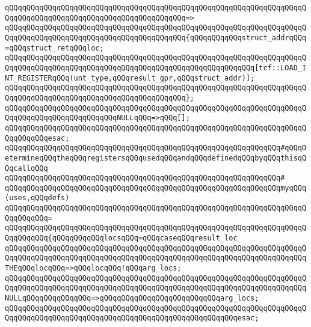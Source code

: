 \verb|qQQqqQQqqQQqqQQqqQQqqQQqqQQqqQQqqQQqqQQqqQQqqQQqqQQqqQQqqQQqqQQqqQQqqQQqqQQqqQQqqQQqqQQqqQQqqQQqqQQqqQQqqQQqqQQq=>|\newline
\verb|qQQqqQQqqQQqqQQqqQQqqQQqqQQqqQQqqQQqqQQqqQQqqQQqqQQqqQQqqQQqqQQqqQQqqQQqqQQqqQQqqQQqqQQqqQQqqQQqqQQqqQQqqQQqqQQq{qQQqqQQqqQQqstruct_addrqQQq=qQQqstruct_retqQQqloc;|\newline
\newline
\verb|qQQqqQQqqQQqqQQqqQQqqQQqqQQqqQQqqQQqqQQqqQQqqQQqqQQqqQQqqQQqqQQqqQQqqQQqqQQqqQQqqQQqqQQqqQQqqQQqqQQqqQQqqQQqqQQqqQQqqQQqqQQqqQQq[tcf::LOAD_INT_REGISTERqQQq(unt_type,qQQqresult_gpr,qQQqstruct_addr)];|\newline
\verb|qQQqqQQqqQQqqQQqqQQqqQQqqQQqqQQqqQQqqQQqqQQqqQQqqQQqqQQqqQQqqQQqqQQqqQQqqQQqqQQqqQQqqQQqqQQqqQQqqQQqqQQqqQQqqQQq};|\newline
\newline
\verb|qQQqqQQqqQQqqQQqqQQqqQQqqQQqqQQqqQQqqQQqqQQqqQQqqQQqqQQqqQQqqQQqqQQqqQQqqQQqqQQqqQQqqQQqqQQqqQQqNULLqQQq=>qQQq[];|\newline
\verb|qQQqqQQqqQQqqQQqqQQqqQQqqQQqqQQqqQQqqQQqqQQqqQQqqQQqqQQqqQQqqQQqqQQqqQQqqQQqqQQqesac;|\newline
\newline
\newline
\verb|qQQqqQQqqQQqqQQqqQQqqQQqqQQqqQQqqQQqqQQqqQQqqQQqqQQqqQQqqQQqqQQq#qQQqDetermineqQQqtheqQQqregistersqQQqusedqQQqandqQQqdefinedqQQqbyqQQqthisqQQqcallqQQq|\newline
\verb|qQQqqQQqqQQqqQQqqQQqqQQqqQQqqQQqqQQqqQQqqQQqqQQqqQQqqQQqqQQqqQQq#|\newline
\verb|qQQqqQQqqQQqqQQqqQQqqQQqqQQqqQQqqQQqqQQqqQQqqQQqqQQqqQQqqQQqqQQqmyqQQq(uses,qQQqdefs)|\newline
\verb|qQQqqQQqqQQqqQQqqQQqqQQqqQQqqQQqqQQqqQQqqQQqqQQqqQQqqQQqqQQqqQQqqQQqqQQqqQQqqQQq=|\newline
\verb|qQQqqQQqqQQqqQQqqQQqqQQqqQQqqQQqqQQqqQQqqQQqqQQqqQQqqQQqqQQqqQQqqQQqqQQqqQQqqQQq{qQQqqQQqqQQqlocsqQQq=qQQqcaseqQQqresult_loc|\newline
\verb|qQQqqQQqqQQqqQQqqQQqqQQqqQQqqQQqqQQqqQQqqQQqqQQqqQQqqQQqqQQqqQQqqQQqqQQqqQQqqQQqqQQqqQQqqQQqqQQqqQQqqQQqqQQqqQQqqQQqqQQqqQQqqQQqqQQqqQQqqQQqTHEqQQqlocqQQq=>qQQqlocqQQq!qQQqarg_locs;|\newline
\verb|qQQqqQQqqQQqqQQqqQQqqQQqqQQqqQQqqQQqqQQqqQQqqQQqqQQqqQQqqQQqqQQqqQQqqQQqqQQqqQQqqQQqqQQqqQQqqQQqqQQqqQQqqQQqqQQqqQQqqQQqqQQqqQQqqQQqqQQqqQQqNULLqQQqqQQqqQQqqQQq=>qQQqqQQqqQQqqQQqqQQqqQQqqQQqarg_locs;|\newline
\verb|qQQqqQQqqQQqqQQqqQQqqQQqqQQqqQQqqQQqqQQqqQQqqQQqqQQqqQQqqQQqqQQqqQQqqQQqqQQqqQQqqQQqqQQqqQQqqQQqqQQqqQQqqQQqqQQqqQQqqQQqqQQqesac;|\newline
